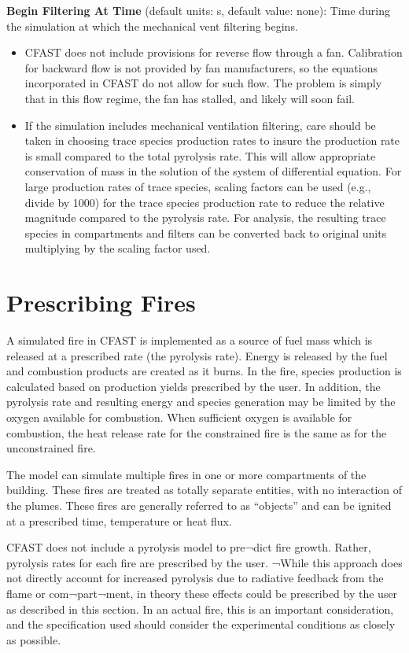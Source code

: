 \textbf{Begin Filtering At Time} (default units: s, default value: none): Time during the simulation at which the mechanical vent filtering begins.

\begin{itemize}
\item CFAST does not include provisions for reverse flow through a fan. Calibration for backward flow is not provided by fan manufacturers, so the equations incorporated in CFAST do not allow for such flow. The problem is simply that in this flow regime, the fan has stalled, and likely will soon fail. 
\item If the simulation includes mechanical ventilation filtering, care should be taken in choosing trace species production rates to insure the production rate is small compared to the total pyrolysis rate.  This will allow appropriate conservation of mass in the solution of the system of differential equation.  For large production rates of trace species, scaling factors can be used (e.g., divide by 1000) for the trace species production rate to reduce the relative magnitude compared to the pyrolysis rate.  For analysis, the resulting trace species in compartments and filters can be converted back to original units multiplying by the scaling factor used.
\end{itemize}

\newpage
\section{Prescribing Fires}

A simulated fire in CFAST is implemented as a source of fuel mass which is released at a prescribed rate (the pyrolysis rate). Energy is released by the fuel and combustion products are created as it burns. In the fire, species production is calculated based on production yields prescribed by the user. In addition, the pyrolysis rate and resulting energy and species generation may be limited by the oxygen available for combustion. When sufficient oxygen is available for combustion, the heat release rate for the constrained fire is the same as for the unconstrained fire.

The model can simulate multiple fires in one or more compartments of the building.  These fires are treated as totally separate entities, with no interaction of the plumes. These fires are generally referred to as “objects” and can be ignited at a prescribed time, temperature or heat flux.

CFAST does not include a pyrolysis model to pre¬dict fire growth. Rather, pyrolysis rates for each fire are prescribed by the user.  ¬While this approach does not directly account for increased pyrolysis due to radiative feedback from the flame or com¬part¬ment, in theory these effects could be prescribed by the user as described in this section.  In an actual fire, this is an important consideration, and the specification used should consider the experimental conditions as closely as possible.

